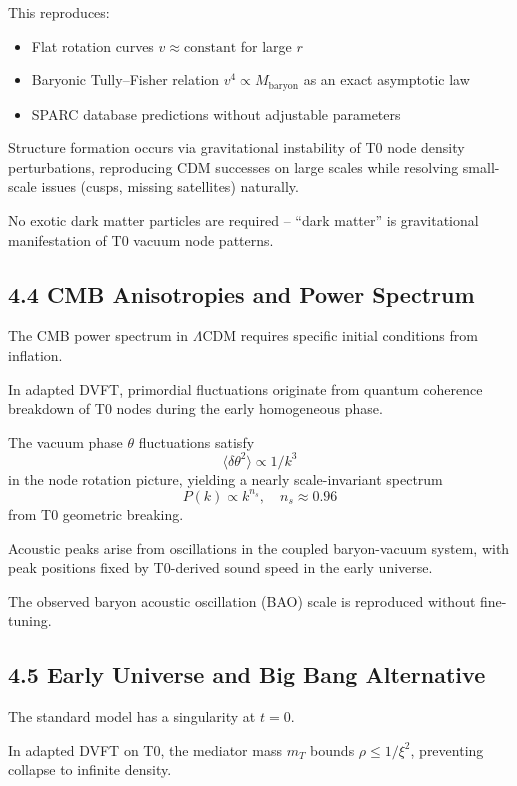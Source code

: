 	This reproduces:
	\begin{itemize}
		\item Flat rotation curves $v \approx \text{constant}$ for large $r$
		\item Baryonic Tully–Fisher relation $v^4 \propto M_{\text{baryon}}$ as an exact asymptotic law
		\item SPARC database predictions without adjustable parameters
	\end{itemize}
	
	Structure formation occurs via gravitational instability of T0 node density perturbations, reproducing CDM successes on large scales while resolving small-scale issues (cusps, missing satellites) naturally.
	
	No exotic dark matter particles are required – ``dark matter'' is gravitational manifestation of T0 vacuum node patterns.
	
	\subsection{4.4 CMB Anisotropies and Power Spectrum}
	
	The CMB power spectrum in $\Lambda$CDM requires specific initial conditions from inflation.
	
	In adapted DVFT, primordial fluctuations originate from quantum coherence breakdown of T0 nodes during the early homogeneous phase.
	
	The vacuum phase $\theta$ fluctuations satisfy
	\[
	\langle \delta \theta^2 \rangle \propto 1/k^3
	\]
	in the node rotation picture, yielding a nearly scale-invariant spectrum
	\[
	P(k) \propto k^{n_s}, \quad n_s \approx 0.96
	\]
	from T0 geometric breaking.
	
	Acoustic peaks arise from oscillations in the coupled baryon-vacuum system, with peak positions fixed by T0-derived sound speed in the early universe.
	
	The observed baryon acoustic oscillation (BAO) scale is reproduced without fine-tuning.
	
	\subsection{4.5 Early Universe and Big Bang Alternative}
	
	The standard model has a singularity at $t=0$.
	
	In adapted DVFT on T0, the mediator mass $m_T$ bounds $\rho \leq 1/\xi^2$, preventing collapse to infinite density.
	
